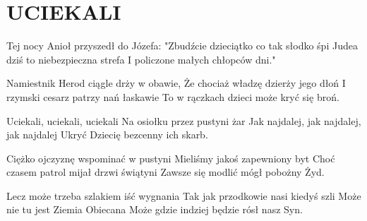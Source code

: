 \documentclass[../../../songbook.tex]{subfiles}
\begin{document}
\TabPositions{8cm} %
\section*{UCIEKALI}
\vspace{0.5cm}
Tej nocy Anioł przyszedł do Józefa:			 \newline	
"Zbudźcie dzieciątko co tak słodko śpi		 \newline	
Judea dziś to niebezpieczna strefa			 \newline	
I policzone małych chłopców dni."			 \newline	

Namiestnik Herod ciągle drży w obawie,		 \newline	
Że chociaż władzę dzierży jego dłoń			 \newline	
I rzymski cesarz patrzy nań łaskawie		 \newline	
To w rączkach dzieci może kryć się broń.	 \newline	

\-\hspace{1cm}Uciekali, uciekali, uciekali				 \newline	
\-\hspace{1cm}Na osiołku przez pustyni żar				 \newline	
\-\hspace{1cm}Jak najdalej, jak najdalej, jak najdalej	 \newline	
\-\hspace{1cm}Ukryć Dziecię bezcenny ich skarb.			 \newline	

Ciężko ojczyznę wspominać w pustyni			\newline
Mieliśmy jakoś zapewniony byt			\newline
Choć czasem patrol mijał drzwi świątyni			\newline
Zawsze się modlić mógł pobożny Żyd.			\newline

Lecz może trzeba szlakiem iść wygnania			\newline
Tak jak przodkowie nasi kiedyś szli			\newline
Może nie tu jest Ziemia Obiecana			\newline
Może gdzie indziej będzie rósł nasz Syn.			\newline
\end{document}
